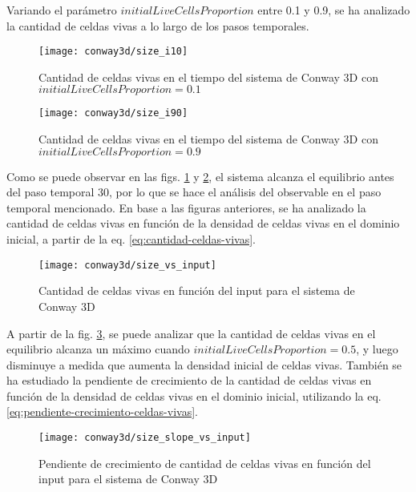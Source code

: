 Variando el parámetro $initialLiveCellsProportion$ entre 0.1 y 0.9, se ha analizado la cantidad de celdas vivas
a lo largo de los pasos temporales.

\begin{figure}[H]
    \centering
    \texttt{[image: conway3d/size\_i10]}
    \caption{Cantidad de celdas vivas en el tiempo del sistema de Conway 3D con $initialLiveCellsProportion = 0.1$}
    \label{fig:conway3d_i10}
\end{figure}
\begin{figure}[H]
    \centering
    \texttt{[image: conway3d/size\_i90]}
    \caption{Cantidad de celdas vivas en el tiempo del sistema de Conway 3D con $initialLiveCellsProportion = 0.9$}
    \label{fig:conway3d_i90}
\end{figure}

Como se puede observar en las figs. \ref{fig:conway3d_i10} y \ref{fig:conway3d_i90}, el sistema alcanza el equilibrio
antes del paso temporal 30, por lo que se hace el análisis del observable en el paso temporal mencionado.
En base a las figuras anteriores, se ha analizado la cantidad de celdas vivas en función de la densidad de celdas
vivas en el dominio inicial, a partir de la eq. \ref{eq:cantidad-celdas-vivas}.

\begin{figure}[H]
    \centering
    \texttt{[image: conway3d/size\_vs\_input]}
    \caption{Cantidad de celdas vivas en función del input para el sistema de Conway 3D}
    \label{fig:conway3d_size_vs_input}
\end{figure}

A partir de la fig. \ref{fig:conway3d_size_vs_input}, se puede analizar que la cantidad
de celdas vivas en el equilibrio alcanza un máximo cuando $initialLiveCellsProportion = 0.5$, y luego
disminuye a medida que aumenta la densidad inicial de celdas vivas.
También se ha estudiado la pendiente de crecimiento de la cantidad de celdas vivas en función de la densidad
de celdas vivas en el dominio inicial, utilizando la eq. \ref{eq:pendiente-crecimiento-celdas-vivas}.

\begin{figure}[H]
    \centering
    \texttt{[image: conway3d/size\_slope\_vs\_input]}
    \caption{Pendiente de crecimiento de cantidad de celdas vivas en función del input para el sistema de Conway 3D}
    \label{fig:conway3d_size_slope_vs_input}
\end{figure}

